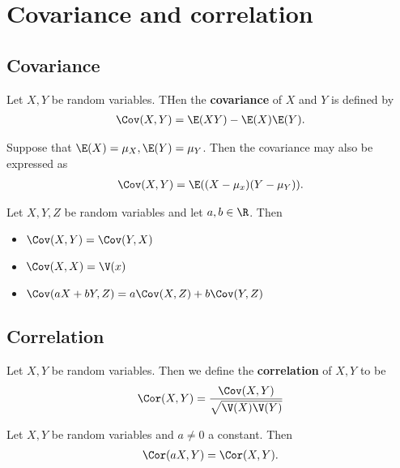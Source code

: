 \documentclass{article}
\begin{document}
\section{Covariance and correlation}


\subsection{Covariance}


\begin{definition}
	Let $X,Y$ be random variables. THen the \textbf{covariance} of $X$ and $Y$ is defined by
	\begin{align*}
		\Cov(X,Y) = \E(XY)-\E(X)\E(Y).
	\end{align*}
\end{definition}

\begin{lemma}
	Suppose that $\E(X)=\mu_X, \E(Y)=\mu_Y$. Then the covariance may also
	be expressed as
	\begin{align*}
		\Cov(X,Y)=\E((X-\mu_x)(Y-\mu_Y)).
	\end{align*}
\end{lemma}

\begin{theorem}
	Let $X,Y,Z$ be random variables and let $a,b\in\R$. Then
	\begin{itemize}
		\item $\Cov(X,Y)=\Cov(Y,X)$
		\item $\Cov(X,X)=\V(x)$
		\item $\Cov(aX+bY, Z)=a\Cov(X,Z)+b\Cov(Y,Z)$
	\end{itemize}
\end{theorem}


\subsection{Correlation}


\begin{definition}
	Let $X,Y$ be random variables. Then we define the \textbf{correlation} of
	$X,Y$ to be
	\begin{align*}
		\Cor(X,Y)=\frac{\Cov(X,Y)}{\sqrt{\V(X)\V(Y)}}
	\end{align*}
\end{definition}
\begin{theorem}
	Let $X,Y$ be random variables and $a\not=0$ a constant. Then
	\begin{align*}
		\Cor(aX,Y)=\Cor(X,Y).
	\end{align*}
\end{theorem}
\end{document}
